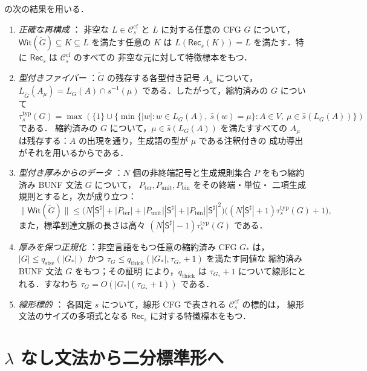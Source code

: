 \documentclass[11pt,a4paper]{ltjsarticle}
\numberwithin{equation}{section}
\theoremstyle{plain}
\theoremstyle{definition}
\theoremstyle{remark}
\theoremstyle{plain}
\newcommand{\cf}{\mathrm{cf}}
\newcommand{\Ccf}[1]{\mathcal C_{#1}^{\cf}}
\newcommand{\Rec}{\mathsf{Rec}}
\newcommand{\WitnessSet}{\mathsf{Wit}}
\begin{document}
\cite{kuriyamaCFG} の次の結果を用いる．

\begin{enumerate}[label=(Q\arabic*),leftmargin=*]
\item\label{q:exact} \emph{正確な再構成} \cite[定理~5.3]{kuriyamaCFG}：
非空な $L\in\Ccf{s}$ と $L$ に対する任意の CFG $G$ について，
$\WitnessSet(\widetilde G)\subseteq K\subseteq L$ を満たす任意の $K$ は
$L(\Rec_s(K))=L$ を満たす．特に $\Rec_s$ は $\Ccf{s}$ のすべての
非空な元に対して特徴標本をもつ．
\item\label{q:typed-core} \emph{型付きファイバー}
\cite[命題~5.1]{kuriyamaCFG}：$\widetilde G$ の残存する各型付き記号
$A_\mu$ について，$L_{\widetilde G}(A_\mu)=L_G(A)\cap\widehat s^{-1}(\mu)$
である．したがって，縮約済みの $G$ について
$\tau^{\mathrm{typ}}_s(G)=\max(\{1\}\cup\{\min\{|w|:w\in L_G(A),\
\widehat s(w)=\mu\}:A\in V,\ \mu\in\widehat s(L_G(A))\})$ である．
縮約済みの $G$ について，$\mu\in\widehat s(L_G(A))$ を満たすすべての
$A_\mu$ は残存する：$A$ の出現を通り，生成語の型が $\mu$ である注釈付きの
成功導出がそれを用いるからである．
\item\label{q:data} \emph{型付き厚みからのデータ}
\cite[補題~6.2，系~6.3]{kuriyamaCFG}：$N$ 個の非終端記号と生成規則集合
$P$ をもつ縮約済み BUNF 文法 $G$ について，
$P_{\mathrm{ter}},P_{\mathrm{unit}},P_{\mathrm{bin}}$ をその終端・単位・
二項生成規則とすると，次が成り立つ：
\[
 \|\WitnessSet(\widetilde G)\|\le
 \bigl(N|\mathsf S^\sharp|+|P_{\mathrm{ter}}|+|P_{\mathrm{unit}}||\mathsf S^\sharp|
 +|P_{\mathrm{bin}}||\mathsf S^\sharp|^2\bigr)
 \bigl((N|\mathsf S^\sharp|+1)\tau^{\mathrm{typ}}_s(G)+1\bigr),
\]
また，標準到達文脈の長さは高々
$(N|\mathsf S^\sharp|-1)\tau^{\mathrm{typ}}_s(G)$ である．
\item\label{q:bunf} \emph{厚みを保つ正規化}
\cite[命題~7.3]{kuriyamaCFG}：非空言語をもつ任意の縮約済み CFG $G_*$ は，
$|G|\le q_{\mathrm{size}}(|G_*|)$ かつ
$\tau_G\le q_{\mathrm{thick}}(|G_*|,\tau_{G_*}+1)$ を満たす同値な
縮約済み BUNF 文法 $G$ をもつ；その証明
\cite[付録~A.2]{kuriyamaCFG} により，$q_{\mathrm{thick}}$ は
$\tau_{G_*}+1$ について線形にとれる．すなわち
$\tau_G=O(|G_*|(\tau_{G_*}+1))$ である．
\item\label{q:linear} \emph{線形標的} \cite[定理~8.3]{kuriyamaCFG}：
各固定 $s$ について，線形 CFG で表される $\Ccf{s}$ の標的は，
線形文法のサイズの多項式となる $\Rec_s$ に対する特徴標本をもつ．
\end{enumerate}

\section{\texorpdfstring{$\lambda$}{Lambda} なし文法から二分標準形へ}
\label{sec:bridge}
\end{document}

